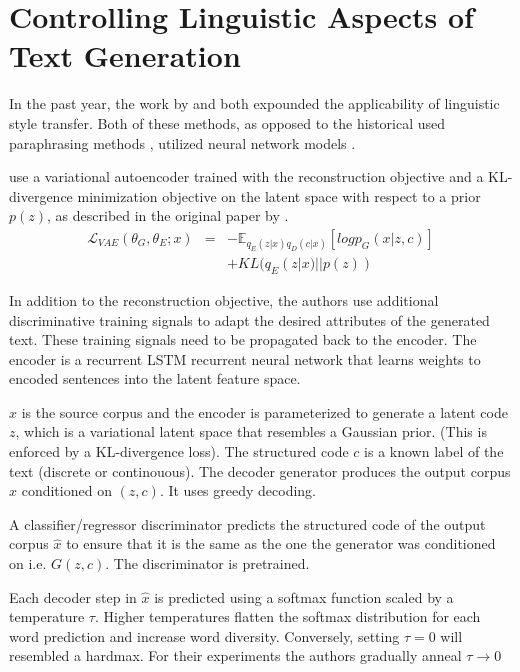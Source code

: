 \section{Controlling Linguistic Aspects of Text Generation}

In the past year, the work by \citep{hu2017toward} and \citep{ficler2017controlling} both expounded the applicability of linguistic style transfer. Both of these methods, as opposed to the historical used paraphrasing methods \citep{xu2012paraphrasing}, utilized neural network models \citep{lecun2015deep}.

\citep{hu2017toward} use a variational autoencoder trained with the reconstruction objective and a KL-divergence minimization objective on the latent space with respect to a prior $p(z)$, as described in the original paper by \cite{kingma2013auto}.
\begin{eqnarray*}
	\mathcal{L}_{VAE}(\theta_G, \theta_E; x) &=&
	- \mathbb{E}_{q_E(z|x)q_D(c|x)}[log p_G(x|z,c)] \\ & &
	+ KL(q_E(z|x)||p(z))
\end{eqnarray*}

In addition to the reconstruction objective, the authors use additional discriminative training signals to adapt the desired attributes of the generated text. These training signals need to be propagated back to the encoder. The encoder is a recurrent LSTM recurrent neural network that learns weights to encoded sentences into the latent feature space.

$x$ is the source corpus and the encoder is parameterized to generate a latent code $z$, which is a variational latent space that resembles a Gaussian prior. (This is enforced by a KL-divergence loss). The structured code $c$ is a known label of the text (discrete or continouous). The decoder generator produces the output corpus $\hat{x}$ conditioned on $(z, c)$. It uses greedy decoding.

A classifier/regressor discriminator predicts the structured code of the output corpus $\hat{x}$ to ensure that it is the same as the one the generator was conditioned on i.e. $G(z, c)$. The discriminator is pretrained.

Each decoder step in $\hat{x}$ is predicted using a softmax function scaled by a temperature $\tau$. Higher temperatures flatten the softmax distribution for each word prediction and increase word diversity. Conversely, setting $\tau = 0$ will resembled a hardmax. For their experiments the authors gradually anneal $\tau \rightarrow 0$

